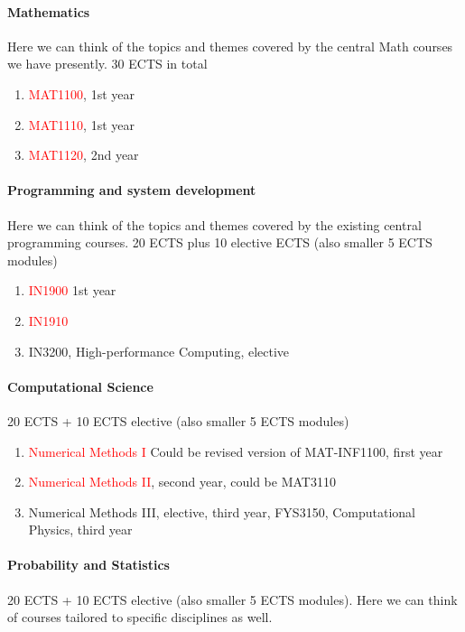 \documentclass[oneside,final,10pt]{article}
\begin{document}
\paragraph{Mathematics}
Here we can think of the topics and themes covered by the central  Math courses we have presently.
30 ECTS in total
\begin{enumerate}
\color{red}
    \item \textcolor{red}{MAT1100}, 1st year
    \item \textcolor{red}{MAT1110}, 1st year
    \item \textcolor{red}{MAT1120}, 2nd year
\end{enumerate}

\paragraph{Programming and system development}
Here we can think of the topics and themes covered by the existing central programming courses.
20 ECTS plus 10 elective ECTS (also smaller 5 ECTS modules)
\begin{enumerate}
    \item \textcolor{red}{IN1900} 1st year
    \item \textcolor{red}{IN1910}
    \item IN3200, High-performance Computing, elective
\end{enumerate}

\paragraph{Computational Science}
20 ECTS + 10 ECTS elective (also smaller 5 ECTS modules)
\begin{enumerate}
    \item \textcolor{red}{Numerical Methods I} Could be revised version of MAT-INF1100, first year
    \item \textcolor{red}{Numerical Methods II}, second year, could be MAT3110
    \item Numerical Methods III, elective,  third year, FYS3150, Computational Physics, third year
\end{enumerate}

\paragraph{Probability and Statistics}
20 ECTS + 10 ECTS elective (also smaller 5 ECTS modules). Here we can think of courses tailored to specific disciplines as well. 
\end{document}

